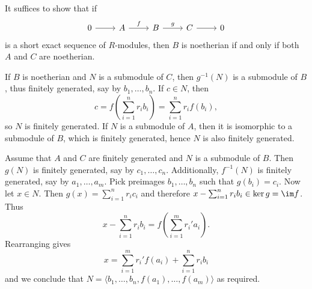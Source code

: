 It suffices to show that if
\[\begin{tikzcd}
	0 \arrow[r] & A \arrow[r, "f"] & B \arrow[r, "g"] & C \arrow[r] & 0
\end{tikzcd}\]
is a short exact sequence of $R$-modules, then $B$ is noetherian if and only if
both $A$ and $C$ are noetherian.

If $B$ is noetherian and $N$ is a submodule of $C$, then $g^{-1}(N)$ is a submodule
of $B$, thus finitely generated, say by $b_1, \ldots, b_n$. If $c \in N$, then
\[ c = f(\sum_{i = 1}^n r_ib_i) = \sum_{i = 1}^n r_if(b_i),\] so $N$ is finitely generated.
If $N$ is a submodule of $A$, then it is isomorphic to a submodule of $B$, which
is finitely generated, hence $N$ is also finitely generated.

Assume that $A$ and $C$ are finitely generated and $N$ is a submodule of $B$.
Then $g(N)$ is finitely generated, say by $c_1, \ldots, c_n$. Additionally,
$f^{-1}(N)$ is finitely generated, say by $a_1, \ldots, a_m$. Pick preimages
$b_1, \ldots, b_n$ such that $g(b_i) = c_i$. Now let $x \in N$. Then
$g(x) = \sum_{i = 1}^nr_ic_i$ and therefore $x - \sum_{i = 1}^nr_ib_i \in \ker g = \im f$.
Thus \[ x - \sum_{i = 1}^n r_ib_i = f(\sum_{i = 1}^mr_i'a_i). \]
Rearranging gives \[ x = \sum_{i = 1}^mr_i'f(a_i) + \sum_{i = 1}^nr_ib_i \]
and we conclude that $N = \langle b_1, \ldots, b_n, f(a_1), \ldots, f(a_m)\rangle$ as
required.
